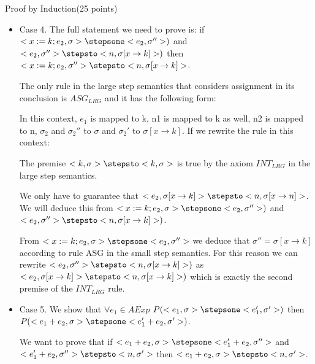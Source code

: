 \documentclass{article}
\begin{document}
\begin{question}{Proof by Induction}{(25 points)}
\begin{subquestion}
\begin{itemize}
\item Case 4. The full statement we need to prove is: if $<x := k; e_2, \sigma> \stepsone <e_2, \sigma''>)$ and $<e_2, \sigma''> \stepsto <n, \sigma[x \rightarrow k]>)$ then $<x := k; e_2, \sigma''> \stepsto <n, \sigma[x \rightarrow k]>$. 

The only rule in the large step semantics that considers assignment in its conclusion is $ASG_{LRG}$ and it has the following form:


In this context, $e_1$ is mapped to k, n1 is mapped to k as well, n2 is mapped to n, $\sigma_2$ and $\sigma_2''$ to $\sigma$ and $\sigma_2'$ to $\sigma[x \rightarrow k]$. If we rewrite the rule in this context:


The premise $<k, \sigma> \stepsto <k, \sigma>$ is true by the axiom $INT_{LRG}$ in the large step semantics. 

We only have to guarantee that $<e_2, \sigma[x \rightarrow k]> \stepsto <n, \sigma[x \rightarrow n]>$. We will deduce this from $<x := k; e_2, \sigma> \stepsone <e_2, \sigma''>)$ and $<e_2, \sigma''> \stepsto <n, \sigma[x \rightarrow k]>)$.

From $<x := k; e_2, \sigma> \stepsone <e_2, \sigma''>$ we deduce that $\sigma'' = \sigma[x \rightarrow k]$ according to rule ASG in the small step semantics. For this reason we can rewrite $<e_2, \sigma''> \stepsto <n, \sigma[x \rightarrow k]>)$ as $<e_2, \sigma[x \rightarrow k]> \stepsto <n, \sigma[x \rightarrow k]>)$ which is exactly the second premise of the $INT_{LRG}$ rule.



\item Case 5. We show that $\forall e_1 \in AExp$ $P(<e_1, \sigma> \stepsone <e_1', \sigma'>)$ then $P(<e_1+e_2, \sigma> \stepsone <e_1'+e_2, \sigma'>)$.

We want to prove that if $<e_1+e_2, \sigma> \stepsone <e_1'+e_2, \sigma''>$ and $<e_1'+e_2, \sigma''> \stepsto <n, \sigma'>$ then $<e_1+e_2, \sigma> \stepsto <n, \sigma'>$.


\end{itemize}
\end{subquestion}
\end{question}
\end{document}

